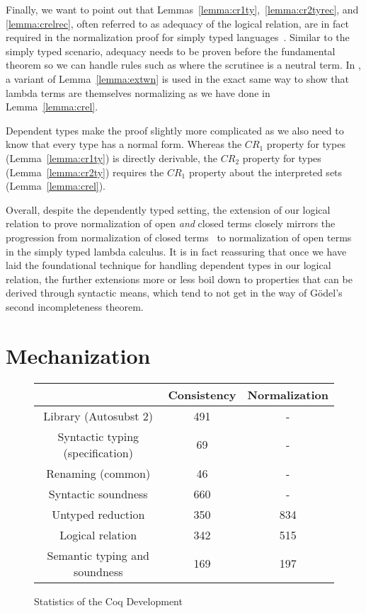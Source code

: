 \documentclass[acmsmall,screen=true,
\ifpublic review=false\else,review=true\fi
  ,anonymous=\ifanonymous true\else false\fi]{acmart}
\newcommand{\scw}[1]{}
\begin{document}
\scw{Name and foreshadow these lemmas when they are introduced so that
it is easier to refer to them in the discussion.}
Finally, we want to point out that
Lemmas~\ref{lemma:cr1ty},~\ref{lemma:cr2tyrec}, and
\ref{lemma:crelrec}, often referred to as adequacy of the logical
relation, are in fact required in the normalization proof for simply
typed languages~\citep{abel2019poplmark}. Similar to the simply typed
scenario, adequacy needs to be proven before the fundamental theorem
so we can handle rules such as  where the scrutinee is a
neutral term. In \citet{abel2019poplmark}, a variant of
Lemma~\ref{lemma:extwn} is used in the exact same way to show that
lambda terms are themselves normalizing as we have done in
Lemma~\ref{lemma:crel}.

Dependent types make the proof slightly more complicated
as we also need to know that every type has a normal form. Whereas the
$CR_1$ property for types (Lemma~\ref{lemma:cr1ty}) is directly
derivable, the $CR_2$ property for types (Lemma~\ref{lemma:cr2ty})
requires the $CR_1$ property about the interpreted sets
(Lemma~\ref{lemma:crel}).

Overall, despite the dependently typed setting,
the extension of our logical relation to prove normalization of open
\emph{and} closed terms closely mirrors the progression from
normalization of closed terms~\citep{harpertait} to normalization of
open terms~\citep{harperkripke} in the simply typed lambda calculus.
It is in fact reassuring that once we have laid the foundational
technique for handling dependent types in our logical relation, the
further extensions more or less boil down to properties that can be
derived through syntactic means, which tend to not get in the way of
Gödel's second incompleteness theorem.

\section{Mechanization}
\label{sec:logrelmech}
\begin{figure}[h]
  \begin{tabular}{ c |  c  | c  }
    & Consistency & Normalization \\
    \hline
    Library (Autosubst 2)  & 491 & - \\
    Syntactic typing (specification) &  69 & - \\
    Renaming (common)  & 46 & -  \\
    Syntactic soundness & 660 &  - \\
    Untyped reduction & 350 & 834 \\
    Logical relation & 342 & 515 \\
    Semantic typing and soundness & 169 & 197 \\
  \end{tabular}
  \caption{Statistics of the Coq Development}
  \label{fig:linecount}
\end{figure}
\end{document}

